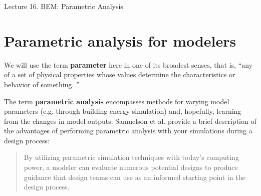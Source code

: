 \documentclass[10pt]{article}
\begin{document}
   \noindent
   \begin{center}

   \hrulefill
   
   \vspace{5pt}
   
   \vspace{0pt}
   
   {\Large \hfill  Lecture 16. BEM: Parametric Analysis}
   \vspace{5pt}
   
  
   \hrulefill
   \end{center}

   {}

\vspace{-2pt}

\section{Parametric analysis for modelers}

We will use the term \textbf{parameter} here in one of its broadest senses, that is, ``any of a set of physical properties whose values determine the characteristics or behavior of something. \cite{noauthor_undated-uq}
''
    
The term \textbf{parametric analysis} encompasses methods for varying model parameters (e.g. through building energy simulation) and, hopefully, learning from the changes in model outputs. Samuelson et al. \cite{Samuelson2016-xw} provide a brief description of the advantages of performing parametric analysis with your simulations during a design process:

\begin{quote}
By utilizing
parametric simulation techniques with today's computing power, a modeler can evaluate numerous potential designs to produce guidance that design teams can use as an informed starting point in the design process. \cite{Samuelson2016-xw}
\end{quote}
\end{document}
